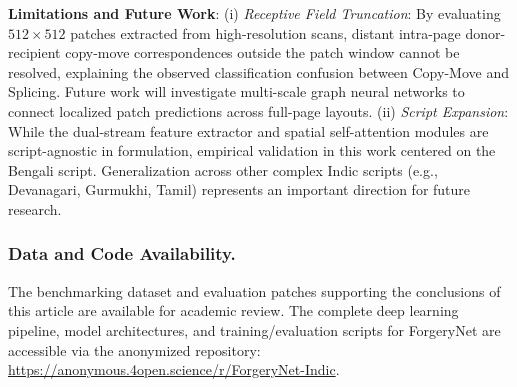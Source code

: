 \documentclass[runningheads]{llncs}
\begin{document}
\noindent
\textbf{Limitations and Future Work}: (i) \textit{Receptive Field Truncation}: By evaluating $512 \times 512$ patches extracted from high-resolution scans, distant intra-page donor-recipient copy-move correspondences outside the patch window cannot be resolved, explaining the observed classification confusion between Copy-Move and Splicing. Future work will investigate multi-scale graph neural networks to connect localized patch predictions across full-page layouts. (ii) \textit{Script Expansion}: While the dual-stream feature extractor and spatial self-attention modules are script-agnostic in formulation, empirical validation in this work centered on the Bengali script. Generalization across other complex Indic scripts (e.g., Devanagari, Gurmukhi, Tamil) represents an important direction for future research.

\subsubsection*{Data and Code Availability.}
The benchmarking dataset and evaluation patches supporting the conclusions of this article are available for academic review. The complete deep learning pipeline, model architectures, and training/evaluation scripts for ForgeryNet are accessible via the anonymized repository: \url{https://anonymous.4open.science/r/ForgeryNet-Indic}.



\end{document}
